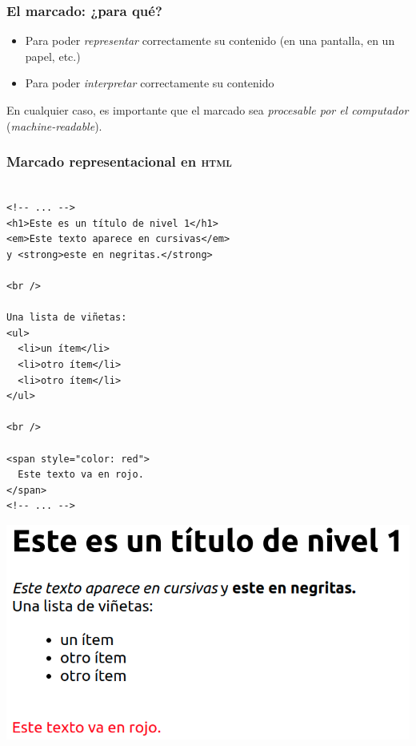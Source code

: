 \documentclass[%
  handout, %
  xcolor=svgnames]{beamer}
\newcommand*{\rojoit}[1]{\textit{\textcolor[HTML]{8B0000}{#1}}}
\begin{document}


\begin{frame}
  \frametitle{El marcado: ¿para qué?}
  \begin{itemize}
    \item Para poder \rojoit{representar} correctamente su contenido (en una pantalla, en un papel, etc.)
    \item Para poder \rojoit{interpretar} correctamente su contenido
  \end{itemize}

  \bigskip

  En cualquier caso, es importante que el marcado sea \textit{procesable por el computador} (\textit{machine-readable}).
  
\end{frame}



\begin{frame}[fragile]
  \frametitle{Marcado representacional en \textsc{html}}

  \begin{minipage}[c]{0.5\linewidth}
\scriptsize
\begin{verbatim}
  
<!-- ... -->  
<h1>Este es un título de nivel 1</h1>
<em>Este texto aparece en cursivas</em>
y <strong>este en negritas.</strong>

<br />

Una lista de viñetas:
<ul>
  <li>un ítem</li>
  <li>otro ítem</li>
  <li>otro ítem</li>
</ul>

<br />

<span style="color: red">
  Este texto va en rojo.
</span>
<!-- ... --> 
    \end{verbatim}
  \end{minipage}%
  \begin{minipage}[t][\textwidth][t]{0.5\linewidth}
    \includegraphics[width=\textwidth]{img/html.png}
  \end{minipage}
    
\end{frame}
\end{document}
